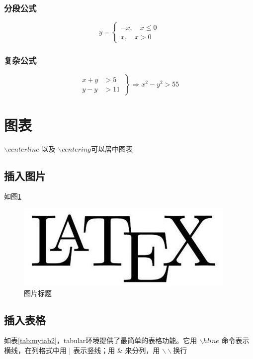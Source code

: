 \subsubsection{分段公式}
\begin{equation}
    y= \begin{cases}
    -x,\quad x\leq 0 \\
    x,\quad x>0
    \end{cases} 
\end{equation}

\subsubsection{复杂公式}
\begin{equation}
\left.
\begin{aligned}
x+y &> 5 \\
y-y &> 11
\end{aligned}
\ \right\}\Rightarrow x^2 - y^2 > 55
\end{equation}


\section{图表}
$\backslash centerline{}$ 以及 $\backslash centering$可以居中图表

\subsection{插入图片}
如图\ref{fig:myfig1}
\begin{figure}[htbp]
\centering
\includegraphics[width = .8\textwidth]{figure/Latex.jpg}
\caption{图片标题}
\label{fig:myfig1}
\end{figure}

\subsection{插入表格}
如表\ref{tab:mytab2}，tabular环境提供了最简单的表格功能。它用 $\backslash hline$ 命令表示横线，在列格式中用 | 表示竖线；用 $\&$ 来分列，用 $\backslash\backslash$换行 

